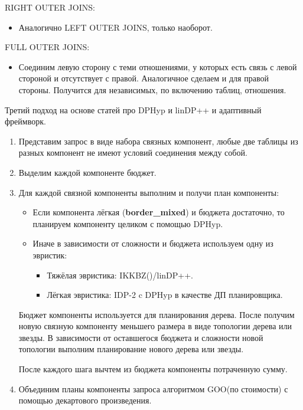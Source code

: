 \documentclass[12pt]{article}
\begin{document}
\begin{flushleft}
RIGHT OUTER JOINS:
\begin{itemize}[label={}]
    \item Аналогично LEFT OUTER JOINS, только наоборот.
\end{itemize}

FULL OUTER JOINS:
\begin{itemize}[label={}]
    \item Соединим левую сторону с теми отношениями, у которых есть связь с левой стороной и отсутствует с правой. Аналогичное сделаем и для правой стороны.
    Получится для независимых, по включению таблиц, отношения.
\end{itemize}

\begin{center}
Третий подход на основе статей про DPHyp\cite{DPhyp} и linDP++\cite{LinDP} и адаптивный фреймворк\cite{Adaptive}.
\end{center}
\begin{enumerate}
    \item Представим запрос в виде набора связных компонент, любые две таблицы из разных компонент не имеют условий соединения между собой. 
    \item Выделим каждой компоненте бюджет.
    \item Для каждой связной компоненты выполним и получи план компоненты:
    \begin{itemize}[label={}]
        \item Если компонента лёгкая (\textbf{border\_mixed}) и бюджета достаточно, то планируем компоненту целиком с помощью DPHyp.
        \item Иначе в зависимости от сложности и бюджета используем одну из эвристик:
        \begin{itemize}[label={}]
            \item Тяжёлая эвристика: IKKBZ(\cite{IK}\cite{KBZ})/linDP++.
            \item Лёгкая эвристика: IDP-2 c DPHyp в качестве ДП планировщика.
        \end{itemize}
    \end{itemize}
    Бюджет компоненты используется для планирования дерева. После получим новую связную компоненту меньшего размера в виде топологии дерева или звезды.
    В зависимости от оставшегося бюджета и сложности новой топологии выполним планирование нового дерева или звезды.
    \newline
    
    После каждого шага вычтем из бюджета компоненты потраченную сумму.
    \item Объединим планы компоненты запроса алгоритмом GOO(по стоимости) с помощью декартового произведения.
\end{enumerate}



\end{flushleft}
\end{document}
